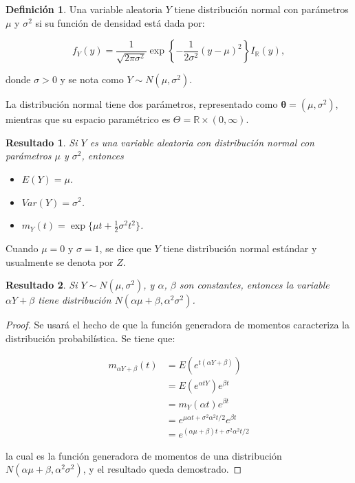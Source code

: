 \documentclass[
  10pt,
  spanish,
]{book}
\providecommand{\tightlist}{%
  \setlength{\itemsep}{0pt}\setlength{\parskip}{0pt}}
\newtheorem{proposition}{Resultado}[chapter]
\theoremstyle{definition}
\newtheorem{definition}{Definición}[chapter]
\theoremstyle{definition}
\theoremstyle{definition}
\theoremstyle{definition}
\theoremstyle{remark}
\begin{document}
\begin{definition}
\protect\hypertarget{def:unnamed-chunk-32}{}{\label{def:unnamed-chunk-32} }Una variable aleatoria \(Y\) tiene distribución normal con parámetros \(\mu\) y \(\sigma^2\) si su función de densidad está dada por:

\begin{equation}
f_Y(y)=\frac{1}{\sqrt{2\pi\sigma^2}}\exp\left\{-\frac{1}{2\sigma^2}(y-\mu)^2\right\}I_\mathbb{R}(y),
\end{equation}

donde \(\sigma>0\) y se nota como \(Y\sim N(\mu,\sigma^2)\).
\end{definition}

La distribución normal tiene dos parámetros, representado como \(\boldsymbol \theta=(\mu,\sigma^2)\), mientras que su espacio paramétrico es \(\Theta=\mathbb{R}\times(0,\infty)\).

\begin{proposition}
\protect\hypertarget{prp:unnamed-chunk-33}{}{\label{prp:unnamed-chunk-33} }Si \(Y\) es una variable aleatoria con distribución normal con parámetros \(\mu\) y \(\sigma^2\), entonces

\begin{itemize}
\tightlist
\item
  \(E(Y)=\mu\).
\item
  \(Var(Y)=\sigma^2\).
\item
  \(m_Y(t)=\exp\{\mu t+\frac{1}{2}\sigma^2t^2\}\).
\end{itemize}
\end{proposition}

Cuando \(\mu=0\) y \(\sigma=1\), se dice que \(Y\) tiene distribución normal estándar y usualmente se denota por \(Z\).

\begin{proposition}
\protect\hypertarget{prp:unnamed-chunk-34}{}{\label{prp:unnamed-chunk-34} }Si \(Y\sim N(\mu,\sigma^2)\), y \(\alpha\), \(\beta\) son constantes, entonces la variable \(\alpha Y+\beta\) tiene distribución \(N(\alpha\mu+\beta,\alpha^2\sigma^2)\).
\end{proposition}

\begin{proof}
\iffalse{} {Prueba. } \fi{}Se usará el hecho de que la función generadora de momentos caracteriza la distribución probabilística. Se tiene que:

\begin{align*}
m_{\alpha Y+\beta}(t)&=E(e^{t(\alpha Y+\beta)})\\
                     &=E(e^{\alpha tY})e^{\beta t}\\
                     &=m_Y(\alpha t)e^{\beta t}\\
                     &=e^{\mu\alpha t+\sigma^2\alpha^2t/2}e^{\beta t}\\
                     &=e^{(\alpha\mu+\beta)t+\sigma^2\alpha^2t/2}
\end{align*}

la cual es la función generadora de momentos de una distribución \(N(\alpha\mu+\beta,\alpha^2\sigma^2)\), y el resultado queda demostrado.
\end{proof}
\end{document}
